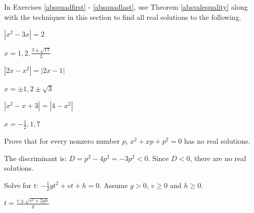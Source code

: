 \documentclass{ximera}
\begin{document}




\begin{question}
In Exercises \ref{absquadfirst} - \ref{absquadlast}, use Theorem \ref{absvalequality} along with the techniques in this section to find all real solutions to the following.

\begin{problem} \label{absquadfirst}
$|x^2 - 3x| = 2$ 

\begin{solution}
$x = 1, 2, \frac{3 \pm \sqrt{17}}{2}$
\end{solution}
\end{problem}

\begin{problem}
$|2x-x^2| = |2x-1|$

\begin{solution}
$x = \pm 1, 2 \pm \sqrt{3}$ 
\end{solution}
\end{problem}

\begin{problem}  \label{absquadlast}
$|x^2 -x + 3| = |4-x^2|$

\begin{solution}
$x = -\frac{1}{2}, 1, 7$
\end{solution}
\end{problem}

\end{question}


\begin{problem}
Prove that for every nonzero number $p$, $x^2 + xp + p^2 = 0$  has no real solutions.

\begin{solution}
The discriminant is: $D = p^2 - 4p^2 = -3p^2 < 0$.  Since $D < 0$, there are no real solutions.  
\end{solution}
\end{problem}

\begin{problem}
Solve for $t$: $-\frac{1}{2} g t^2 + vt + h = 0$. Assume $g > 0$, $v \geq 0$ and $h \geq 0$.

\begin{solution}
$t = \frac{v \pm \sqrt{v^2 + 2gh}}{g}$
\end{solution}
\end{problem}
\end{document}
